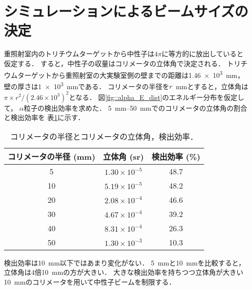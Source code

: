 \documentclass[../master]{subfiles}
\begin{document}
\section{シミュレーションによるビームサイズの決定}
重照射室内のトリチウムターゲットから中性子は$4\pi$に等方的に放出していると仮定する．
すると，中性子の収量はコリメータの立体角で決定される．
トリチウムターゲットから重照射室の大実験室側の壁までの距離は\SI{1.46e3}{\milli\metre}，
壁の厚さは\SI{1e3}{\milli\metre}である．
コリメータの半径を$r$~\si{\milli\metre}とすると，立体角は
$\pi\times r^2/\left(2.46\times10^3\right)^2$となる．
図\ref{fig::alpha_E_dist}のエネルギー分布を仮定して，
$\alpha$粒子の検出効率を求めた．
\SIrange{5}{50}{\milli\metre}でのコリメータの立体角の割合と検出効率を
表\ref{tab::solid_angle_percent}に示す．
\begin{table}
  \centering
  \caption{コリメータの半径とコリメータの立体角，検出効率．}
  \label{tab::solid_angle_percent}
  \begin{tabular}{ccc}
    \toprule
    コリメータの半径 (\si{\milli\metre}) & 立体角 (\si{\steradian}) & 検出効率 (\si{\percent})\\%
    \midrule
     5 & $1.30\times10^{-5}$ & 48.7 \\%
    10 & $5.19\times10^{-5}$ & 48.2 \\%
    20 & $2.08\times10^{-4}$ & 46.6 \\%
    30 & $4.67\times10^{-4}$ & 39.2 \\%
    40 & $8.31\times10^{-4}$ & 26.3 \\%
    50 & $1.30\times10^{-3}$ & 10.3 \\%
    \bottomrule
  \end{tabular}
\end{table}

検出効率は\SI{10}{\milli\metre}以下ではあまり変化がない．
\SI{5}{\milli\metre}と\SI{10}{\milli\metre}を比較すると，
立体角は4倍\SI{10}{\milli\metre}の方が大きい．
大きな検出効率を持ちつつ立体角が大きい\SI{10}{\milli\metre}のコリメータを用いて中性子ビームを制限する．
\end{document}
